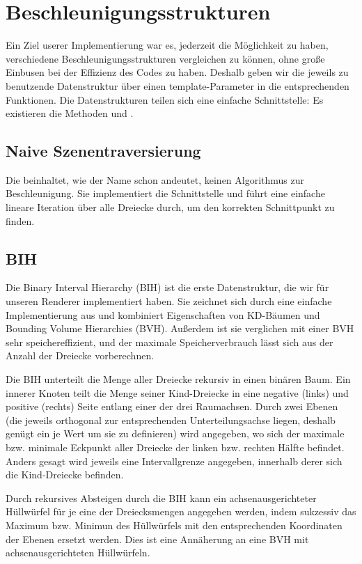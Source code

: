 \section{Beschleunigungsstrukturen}

Ein Ziel userer Implementierung war es, jederzeit die Möglichkeit zu haben, verschiedene Beschleunigungsstrukturen vergleichen zu können, ohne große Einbusen bei der Effizienz des Codes zu haben. Deshalb geben wir die jeweils zu benutzende Datenstruktur über einen template-Parameter in die entsprechenden Funktionen. Die Datenstrukturen teilen sich eine einfache Schnittstelle: Es existieren die Methoden  und .

\subsection{Naive Szenentraversierung}

Die  beinhaltet, wie der Name schon andeutet, keinen Algorithmus zur Beschleunigung. Sie implementiert die Schnittstelle und führt eine einfache lineare Iteration über alle Dreiecke durch, um den korrekten Schnittpunkt zu finden.

\subsection{BIH}
\label{ssec:bih}

Die Binary Interval Hierarchy (BIH) ist die erste Datenstruktur, die wir für unseren Renderer implementiert haben. Sie zeichnet sich durch eine einfache Implementierung aus und kombiniert Eigenschaften von KD-Bäumen und Bounding Volume Hierarchies (BVH). Außerdem ist sie verglichen mit einer BVH sehr speichereffizient, und der maximale Speicherverbrauch lässt sich aus der Anzahl der Dreiecke vorberechnen.

Die BIH unterteilt die Menge aller Dreiecke rekursiv in einen binären Baum. Ein innerer Knoten teilt die Menge seiner Kind-Dreiecke in eine negative (links) und positive (rechts) Seite entlang einer der drei Raumachsen. Durch zwei Ebenen (die jeweils orthogonal zur entsprechenden Unterteilungsachse liegen, deshalb genügt ein je  Wert um sie zu definieren) wird angegeben, wo sich der maximale bzw. minimale Eckpunkt aller Dreiecke der linken bzw. rechten Hälfte befindet. Anders gesagt wird jeweils eine Intervallgrenze angegeben, innerhalb derer sich die Kind-Dreiecke befinden.

Durch rekursives Absteigen durch die BIH kann ein achsenausgerichteter Hüllwürfel für je eine der Dreiecksmengen angegeben werden, indem sukzessiv das Maximum bzw. Minimun des Hüllwürfels mit den entsprechenden Koordinaten der Ebenen ersetzt werden. Dies ist eine Annäherung an eine BVH mit achsenausgerichteten Hüllwürfeln.

